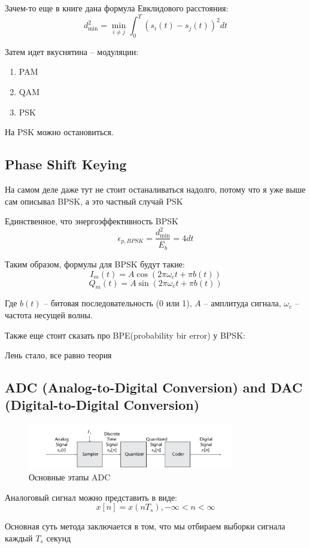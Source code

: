 \documentclass[14pt, report]{extarticle}
\begin{document}
Зачем-то еще в книге дана формула Евклидового расстояния:
\[
d_{\min}^2 = \min_{i \not = j} \int_0^T(s_i(t) - s_j(t))^2 dt
\]

Затем идет вкуснятина -- модуляции:
\begin{enumerate}
  \item PAM
  \item QAM
  \item PSK
\end{enumerate}

На PSK можно остановиться.
\subsection{Phase Shift Keying}

\par На самом деле даже тут не стоит останаливаться надолго, 
потому что я уже выше сам описывал BPSK, а это частный случай PSK

\par Единственное, что энергоэффективность BPSK
\[
\epsilon_{p, BPSK} = \frac{d_{\min}^2 }{\overline{E_b}} = 4 dt
\]


\par Таким образом, формулы для BPSK будут такие:
\[ I_m(t) = A \cos(2 \pi \omega_c t + \pi b(t)) \]
\[ Q_m(t) = A \sin(2 \pi \omega_c t + \pi b(t)) \]

Где \( b(t) \) -- битовая последовательность (0 или 1),
\( A \) -- амплитуда сигнала, \( \omega_c \) -- частота несущей волны.

\par Также еще стоит сказать про BPE(probability bir error) у BPSK:
\par Лень стало, все равно теория

\subsection{ADC (Analog-to-Digital Conversion) and DAC (Digital-to-Digital Conversion)}

\begin{figure}[h]
  \centering
  \includegraphics[width=0.8\textwidth]{../adc.png}
  \caption{Основные этапы ADC}
\end{figure}

Аналоговый сигнал можно представить в виде:
\[
x[n] = x(nT_s), -\infty < n < \infty
\]

Основная суть метода заключается в том,
что мы отбираем выборки сигнала каждый $T_s$ секунд
\end{document}
